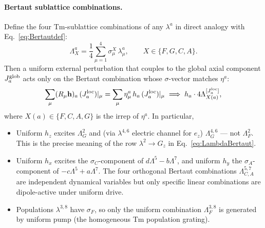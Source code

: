 \documentclass[reprint,amsmath,amssymb,aps,prb,longbibliography]{revtex4-2}
\begin{document}
\paragraph{Bertaut sublattice combinations.} Define the four
Tm-sublattice combinations of any $\lambda^a$ in direct analogy with
Eq.~\eqref{eq:Bertautdef}:
\begin{equation}
\Lambda^a_X = \frac{1}{4}\sum_{\mu=1}^{4}\sigma^X_\mu\,\lambda^a_\mu,\qquad
X\in\{F,G,C,A\}.
\label{eq:LambdaXdef}
\end{equation}
Then a uniform external perturbation that couples to the global axial
component $J_a^{\rm glob}$ acts only on the Bertaut combination whose
$\sigma$-vector matches $\eta^a$:
\begin{equation}
\sum_\mu (R_\mu \mathbf h)_{a}\,(J_a^{\rm loc})|_\mu
= \sum_\mu \eta^a_\mu\,h_a\,(J_a^{\rm loc})|_\mu
\;\Longrightarrow\; h_a\cdot 4\Lambda^{[J_a^{\rm loc}]}_{X(a)},
\label{eq:uniformsel}
\end{equation}
where $X(a)\in\{F,C,A,G\}$ is the irrep of $\eta^a$. In particular,
\begin{itemize}[leftmargin=*]
\item Uniform $h_z$ excites $\Lambda^2_G$ and (via $\lambda^{4,6}$
electric channel for $e_z$) $\Lambda^{4,6}_G$ --- not $\Lambda^2_F$.
This is the precise meaning of the row $\lambda^2\to G_z$ in
Eq.~\eqref{eq:LambdaBertaut}.
\item Uniform $h_x$ excites the $\sigma_C$-component of
$d\Lambda^5 - b\Lambda^7$, and uniform $h_y$ the $\sigma_A$-component of
$-c\Lambda^5 + a\Lambda^7$. The four orthogonal Bertaut combinations
$\Lambda^{5,7}_{C,A}$ are independent dynamical variables but only
specific linear combinations are dipole-active under uniform drive.
\item Populations $\lambda^{3,8}$ have $\sigma_F$, so only the uniform
combination $\Lambda^{3,8}_F$ is generated by uniform pump (the
homogeneous Tm population grating).
\end{itemize}
\end{document}

